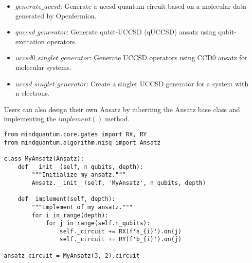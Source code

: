 \begin{itemize}
    \item $generate\_uccsd$: Generate a uccsd quantum circuit based on a molecular data generated by Openfermion.
    \item $quccsd\_generator$: Generate qubit-UCCSD (qUCCSD) ansatz using qubit-excitation operators.
    \item $uccsd0\_singlet\_generator$: Generate UCCSD operators using CCD0 ansatz for molecular systems.
    \item $uccsd\_singlet\_generator$: Create a singlet UCCSD generator for a system with n electrons.
\end{itemize}


Users can also design their own Ansatz by inheriting the Ansatz base class and implementing the $implement()$ method.

\begin{lstlisting}
from mindquantum.core.gates import RX, RY
from mindquantum.algorithm.nisq import Ansatz

class MyAnsatz(Ansatz):
    def __init__(self, n_qubits, depth):
        """Initialize my ansatz."""
        Ansatz.__init__(self, 'MyAnsatz', n_qubits, depth)

    def _implement(self, depth):
        """Implement of my ansatz."""
        for i in range(depth):
            for j in range(self.n_qubits):
                self._circuit += RX(f'a_{i}').on(j)
                self._circuit += RY(f'b_{i}').on(j)

ansatz_circuit = MyAnsatz(3, 2).circuit
\end{lstlisting}